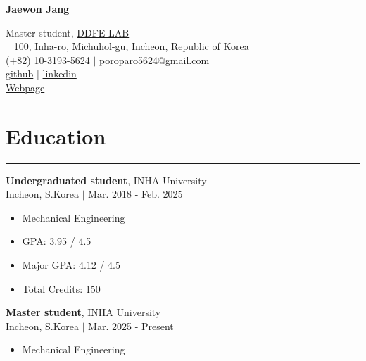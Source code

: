 \documentclass{article} %
\newcommand{\mycventry}[5]{
  \vspace{1.5em} %

  \textbf{#1}, #2 \\ %
  #3 $|$ #4 \\[0.4em] %

  \begin{itemize}[nosep, after=\vspace{-0.4em}] %
    #5 %
  \end{itemize}
}
\newcommand{\sectionsplitrule}{
  \hrule %
  \vspace{1em} %
}
\begin{document}
\begin{center}
    {\Huge \textbf{Jaewon Jang}} %

    \vspace{0.5em} %

    Master student, \href{https://sites.google.com/view/ddfegroup/home}{DDFE LAB} \\%
\ %
    100, Inha-ro, Michuhol-gu, Incheon, Republic of Korea \\ %
    (+82) 10-3193-5624 $|$ \href{mailto:poroparo5624@gmail.com}{poroparo5624@gmail.com} \\ %
    \href{https://github.com/VortexyAether}{github} $|$ \href{https://www.linkedin.com/in/jaewon-jang-895785252}{linkedin} \\ %
    \href{https://vortexyaether.github.io}{Webpage} 
\end{center}




\section*{Education}
\sectionsplitrule

\mycventry
  {Undergraduated student} %
  {INHA University} %
  {Incheon, S.Korea} %
  {Mar. 2018 - Feb. 2025} %
  { %
    \item Mechanical Engineering 
    \item GPA: 3.95 / 4.5
    \item Major GPA: 4.12 / 4.5
    \item Total Credits: 150 
  }

\mycventry
  {Master student}
  {INHA University} %
  {Incheon, S.Korea} %
  {Mar. 2025 - Present} %
  {
    \item Mechanical Engineering 
  }
\end{document}
